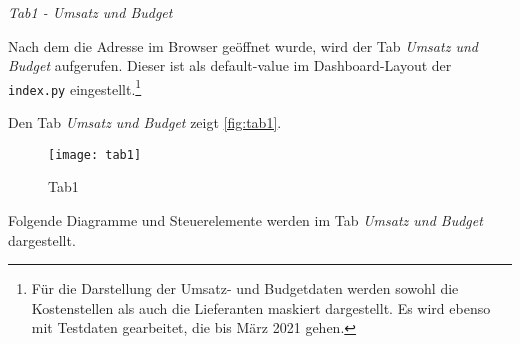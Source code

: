     \clearpage
    \noindent
    \textit{Tab1 - Umsatz und Budget}

    Nach dem die Adresse im Browser geöffnet wurde, wird der Tab \textit{Umsatz und Budget} aufgerufen. Dieser ist
    als default-value im Dashboard-Layout der \texttt{index.py} eingestellt.\footnote{Für die Darstellung der Umsatz- und
    Budgetdaten werden sowohl die Kostenstellen als auch die Lieferanten maskiert dargestellt. Es wird ebenso mit Testdaten
    gearbeitet, die bis März 2021 gehen.}

    Den Tab \textit{Umsatz und Budget} zeigt \autoref{fig:tab1}.

    
    \begin{figure}[H]
        \centering
            \texttt{[image: tab1]}
            \caption{Tab1}
            \label{fig:tab1}
    \end{figure}

    \clearpage
    Folgende Diagramme und Steuerelemente werden im Tab \textit{Umsatz und Budget} dargestellt.

